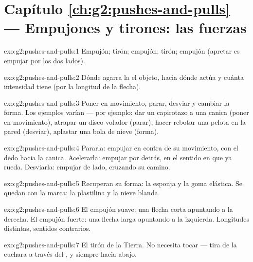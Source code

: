 \section*{Capítulo \ref{ch:g2:pushes-and-pulls} --- Empujones y tirones: las fuerzas}

\begin{solution}{exo:g2:pushes-and-pulls:1}
Empujón; tirón; empujón; tirón; empujón (apretar es empujar por los
dos lados).
\end{solution}

\begin{solution}{exo:g2:pushes-and-pulls:2}
Dónde agarra la  el objeto, hacia dónde actúa y cuánta
intensidad tiene (por la longitud de la flecha).
\end{solution}

\begin{solution}{exo:g2:pushes-and-pulls:3}
Poner en movimiento, parar, desviar y cambiar la forma. Los ejemplos
varían --- por ejemplo: dar un capirotazo a una canica (poner en
movimiento), atrapar un disco volador (parar), hacer rebotar una
pelota en la pared (desviar), aplastar una bola de nieve (forma).
\end{solution}

\begin{solution}{exo:g2:pushes-and-pulls:4}
Pararla: empujar en contra de su movimiento, con el dedo hacia la
canica. Acelerarla: empujar por detrás, en el sentido en que ya rueda.
Desviarla: empujar de lado, cruzando su camino.
\end{solution}

\begin{solution}{exo:g2:pushes-and-pulls:5}
Recuperan su forma: la esponja y la goma elástica. Se quedan con la
marca: la plastilina y la nieve blanda.
\end{solution}

\begin{solution}{exo:g2:pushes-and-pulls:6}
El empujón suave: una flecha corta apuntando a la derecha. El empujón
fuerte: una flecha larga apuntando a la izquierda. Longitudes
distintas, sentidos contrarios.
\end{solution}

\begin{solution}{exo:g2:pushes-and-pulls:7}
El tirón de la Tierra. No necesita tocar --- tira de la cuchara a
través del , y siempre hacia abajo.
\end{solution}

